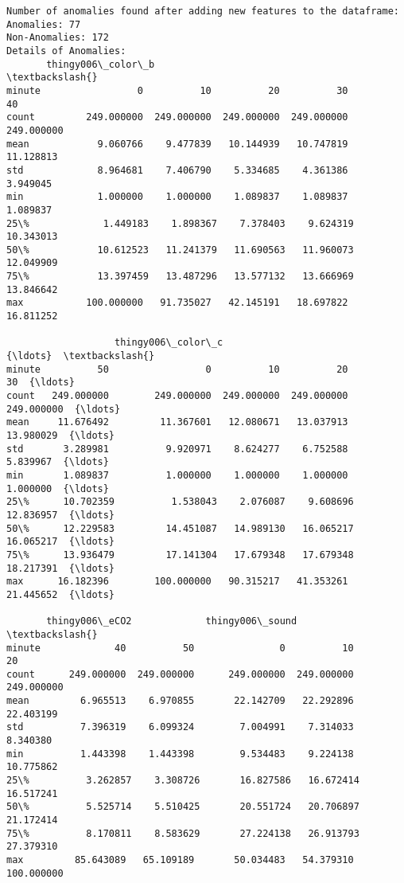 \documentclass[11pt]{article}
\begin{document}
    \begin{Verbatim}[commandchars=\\\{\}]
Number of anomalies found after adding new features to the dataframe:
Anomalies: 77
Non-Anomalies: 172
Details of Anomalies:
       thingy006\_color\_b                                                  \textbackslash{}
minute                 0          10          20          30          40
count         249.000000  249.000000  249.000000  249.000000  249.000000
mean            9.060766    9.477839   10.144939   10.747819   11.128813
std             8.964681    7.406790    5.334685    4.361386    3.949045
min             1.000000    1.000000    1.089837    1.089837    1.089837
25\%             1.449183    1.898367    7.378403    9.624319   10.343013
50\%            10.612523   11.241379   11.690563   11.960073   12.049909
75\%            13.397459   13.487296   13.577132   13.666969   13.846642
max           100.000000   91.735027   42.145191   18.697822   16.811252

                   thingy006\_color\_c                                      {\ldots}  \textbackslash{}
minute          50                 0          10          20          30  {\ldots}
count   249.000000        249.000000  249.000000  249.000000  249.000000  {\ldots}
mean     11.676492         11.367601   12.080671   13.037913   13.980029  {\ldots}
std       3.289981          9.920971    8.624277    6.752588    5.839967  {\ldots}
min       1.089837          1.000000    1.000000    1.000000    1.000000  {\ldots}
25\%      10.702359          1.538043    2.076087    9.608696   12.836957  {\ldots}
50\%      12.229583         14.451087   14.989130   16.065217   16.065217  {\ldots}
75\%      13.936479         17.141304   17.679348   17.679348   18.217391  {\ldots}
max      16.182396        100.000000   90.315217   41.353261   21.445652  {\ldots}

       thingy006\_eCO2             thingy006\_sound                          \textbackslash{}
minute             40          50               0          10          20
count      249.000000  249.000000      249.000000  249.000000  249.000000
mean         6.965513    6.970855       22.142709   22.292896   22.403199
std          7.396319    6.099324        7.004991    7.314033    8.340380
min          1.443398    1.443398        9.534483    9.224138   10.775862
25\%          3.262857    3.308726       16.827586   16.672414   16.517241
50\%          5.525714    5.510425       20.551724   20.706897   21.172414
75\%          8.170811    8.583629       27.224138   26.913793   27.379310
max         85.643089   65.109189       50.034483   54.379310  100.000000


\end{Verbatim}
\end{document}
